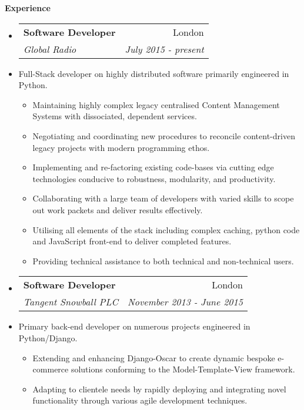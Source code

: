 \documentclass[letterpaper,11pt]{article}
\makeatletter
\newcommand{\resitem}[1]{\item #1 \vspace{-2pt}}
\newcommand{\resheading}[1]{{\large \colorbox{mygrey}
                            {\begin{minipage}{\textwidth}
                            {\textbf{#1 \vphantom{p\^{E}}}}
                            \end{minipage}}}
}
\newcommand{\ressubheading}[4]{
                \begin{tabular*}{180mm}{l@{\extracolsep{\fill}}r}
                \textbf{#1} & #2 \\
                \textit{#3} & \textit{#4} \\
                \end{tabular*}\vspace{-6pt}
}
\newcommand{\resdescription}[1]{#1 \vspace{-0mm}}
\makeatother
\begin{document}
    \resheading{Experience}
    \begin{itemize}

        \item[]
            \ressubheading{Software Developer}{London}{Global Radio}{July 2015 - present}
        \item[]
            \resdescription{Full-Stack developer on highly distributed software primarily engineered in Python.}
            \begin{itemize}
                    \resitem{Maintaining highly complex legacy centralised Content Management Systems with dissociated, dependent services.}
                    \resitem{Negotiating and coordinating new procedures to reconcile content-driven legacy projects with modern programming ethos.}
                    \resitem{Implementing and re-factoring existing code-bases via cutting edge technologies conducive to robustness, modularity, and productivity.}
                    \resitem{Collaborating with a large team of developers with varied skills to scope out work packets and deliver results effectively.}
                    \resitem{Utilising all elements of the stack including complex caching, python code and JavaScript front-end to deliver completed features.}
                    \resitem{Providing technical assistance to both technical and non-technical users.}
            \end{itemize}


        \item[]
            \ressubheading{Software Developer}{London}{Tangent Snowball PLC}{November 2013 - June 2015}
        \item[]
            \resdescription{Primary back-end developer on numerous projects engineered in Python/Django.}
            \begin{itemize}
                    \resitem{Extending and enhancing Django-Oscar to create dynamic bespoke e-commerce solutions conforming to the Model-Template-View framework.}
                    \resitem{Adapting to clientele needs by rapidly deploying and integrating novel functionality through various agile development techniques.}
            \end{itemize}


\end{itemize}
\end{document}
